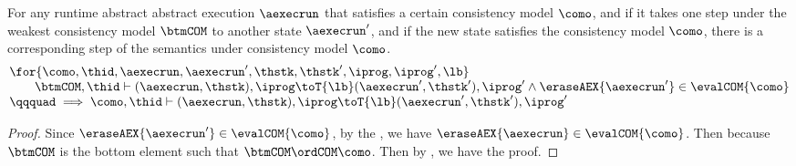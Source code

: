 \begin{thm}
For any runtime abstract abstract execution \( \aexecrun \) that satisfies a certain consistency model \( \como \), and if it takes one step under the weakest consistency model \( \btmCOM \) to another state \( \aexecrun' \), and if the new state satisfies the consistency model \( \como \), there is a corresponding step of the semantics under consistency model \( \como \).
 \[
 \begin{array}{@{}l@{}}
    \for{\como, \thid, \aexecrun, \aexecrun', \thstk, \thstk', \iprog, {\iprog}', \lb} \\
    \qquad \btmCOM, \thid \vdash (\aexecrun, \thstk), \iprog \toT{\lb} (\aexecrun', \thstk'), {\iprog}' \land \eraseAEX{\aexecrun'} \in \evalCOM{\como} \\
    \qqquad \implies \como, \thid \vdash (\aexecrun, \thstk), \iprog \toT{\lb} (\aexecrun', \thstk'), {\iprog}' 
 \end{array}
 \]
\end{thm}
\begin{proof}
Since \( \eraseAEX{\aexecrun'} \in \evalCOM{\como} \), by the , we have \( \eraseAEX{\aexecrun} \in \evalCOM{\como} \).
Then because \( \btmCOM \) is the bottom element such that \( \btmCOM \ordCOM \como \).
Then by , we have the proof.
\end{proof}
